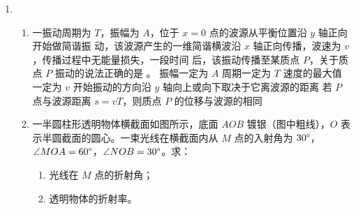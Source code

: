 \begin{enumerate}
\begin{enumerate}



\end{enumerate}


\item 
{}
\begin{enumerate}
	\item
一振动周期为 $ T $，振幅为 $ A $，位于 $ x=0 $ 点的波源从平衡位置沿 $ y $ 轴正向开始做简谐振
动，该波源产生的一维简谐横波沿 $ x $ 轴正向传播，波速为 $ v $，传播过程中无能量损失，一段时间
后，该振动传播至某质点 $ P $，关于质点 $ P $ 振动的说法正确的是 \underlinegap 。
\fivechoices
{振幅一定为 $ A $}
{周期一定为 $ T $}
{速度的最大值一定为 $ v $}
{开始振动的方向沿 $ y $ 轴向上或向下取决于它离波源的距离}
{若 $ P $ 点与波源距离 $ s=vT $，则质点 $ P $ 的位移与波源的相同}



\item 
一半圆柱形透明物体横截面如图所示，底面 $ AOB $
镀银（图中粗线），$ O $ 表示半圆截面的圆心。一束光线在横截面内从 $ M $ 点的入射角为 $ 30 \degree $，
$ \angle MOA=60 \degree $，$ \angle NOB=30 \degree $。求：
\begin{enumerate}
	\item
光线在 $ M $ 点的折射角；
\item 
透明物体的折射率。
	
\end{enumerate}
\begin{figure}[h!]
	\flushright
	
\end{figure}







\end{enumerate}
\end{enumerate}

